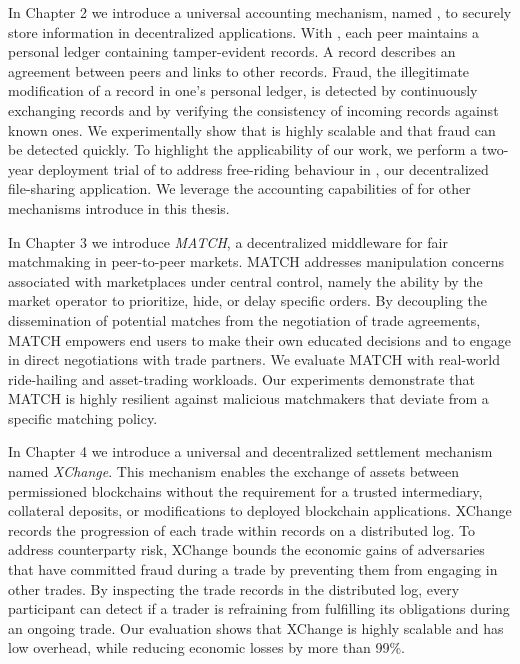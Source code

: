 In Chapter 2 we introduce a universal accounting mechanism, named \emph{\TrustChain{}}, to securely store information in decentralized applications.
With \TrustChain{}, each peer maintains a personal ledger containing tamper-evident records.
A record describes an agreement between peers and links to other records.
Fraud, the illegitimate modification of a record in one's personal ledger, is detected by continuously exchanging records and by verifying the consistency of incoming records against known ones.
We experimentally show that \TrustChain{} is highly scalable and that fraud can be detected quickly.
To highlight the applicability of our work, we perform a two-year deployment trial of \TrustChain{} to address free-riding behaviour in \Tribler{}, our decentralized file-sharing application.
We leverage the accounting capabilities of \TrustChain{} for other mechanisms introduce in this thesis.

In Chapter 3 we introduce \emph{MATCH}, a decentralized middleware for fair matchmaking in peer-to-peer markets.
MATCH addresses manipulation concerns associated with marketplaces under central control, namely the ability by the market operator to prioritize, hide, or delay specific orders.
By decoupling the dissemination of potential matches from the negotiation of trade agreements, MATCH empowers end users to make their own educated decisions and to engage in direct negotiations with trade partners.
We evaluate MATCH with real-world ride-hailing and asset-trading workloads.
Our experiments demonstrate that MATCH is highly resilient against malicious matchmakers that deviate from a specific matching policy.

In Chapter 4 we introduce a universal and decentralized settlement mechanism named \emph{XChange}.
This mechanism enables the exchange of assets between permissioned blockchains without the requirement for a trusted intermediary, collateral deposits, or modifications to deployed blockchain applications.
XChange records the progression of each trade within records on a distributed log.
To address counterparty risk, XChange bounds the economic gains of adversaries that have committed fraud during a trade by preventing them from engaging in other trades.
By inspecting the trade records in the distributed log, every participant can detect if a trader is refraining from fulfilling its obligations during an ongoing trade.
Our evaluation shows that XChange is highly scalable and has low overhead, while reducing economic losses by more than 99\%.

